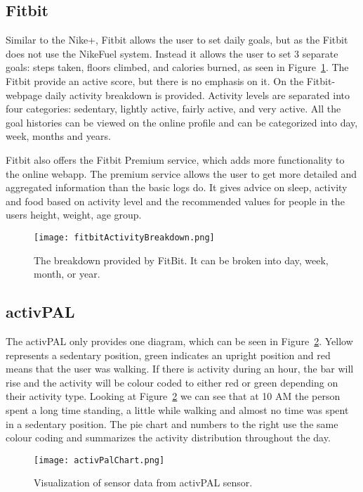\subsection{Fitbit}
Similar to the Nike+, Fitbit \cite{fitBit} allows the user to set daily goals, but as the Fitbit does not use the NikeFuel system. Instead it allows the user to set 3 separate goals: steps taken, floors climbed, and calories burned, as seen in Figure~\ref{fig:fitbitActivityBreakdown}. The Fitbit provide an active score, but there is no emphasis on it. On the Fitbit-webpage daily activity breakdown is provided. Activity levels are separated into four categories: sedentary, lightly active, fairly active, and very active. All the goal histories can be viewed on the online profile and can be categorized into day, week, months and years. 

Fitbit also offers the Fitbit Premium service, which adds more functionality to the online webapp. The premium service allows the user to get more detailed and aggregated information than the basic logs do. It gives advice on sleep, activity and food based on activity level and the recommended values for people in the users height, weight, age group.

\clearpage

\begin{figure}[t]
	\centering
		\texttt{[image: fitbitActivityBreakdown.png]}
		\caption[Fitbit+ visualizations]{The breakdown provided by FitBit. It can be broken into day, week, month, or year.}
		\label{fig:fitbitActivityBreakdown}
\end{figure}

\subsection{activPAL}
\label{sec:activPALViz}
The activPAL only provides one diagram, which can be seen in Figure~\ref{fig:activPalActivityBreakdown}. Yellow represents a sedentary position, green indicates an upright position and red means that the user was walking. If there is activity during an hour, the bar will rise and the activity will be colour coded to either red or green depending on their activity type. Looking at Figure~\ref{fig:activPalActivityBreakdown} we can see that at 10 AM the person spent a long time standing, a little while walking and almost no time was spent in a sedentary position. The pie chart and numbers to the right use the same colour coding and summarizes the activity distribution throughout the day.

\begin{figure}[h!]
	\centering
		\texttt{[image: activPalChart.png]}
		\caption[activPal visualizations]{Visualization of sensor data from activPAL sensor.}
		\label{fig:activPalActivityBreakdown}
\end{figure}
